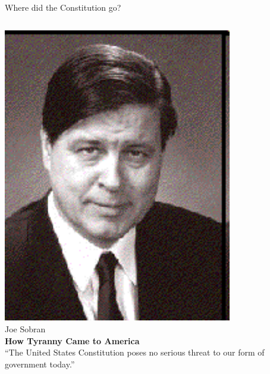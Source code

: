 \begin{frame}{Where did the Constitution go?}
    \begin{columns}[onlytextwidth]
            \centering
            \includegraphics[width=0.75\textwidth]{img/joe-sobran.png} \\
            Joe Sobran \\

            \textbf{How Tyranny Came to America} \\
            \vspace{20pt}
            {\large
                ``The United States Constitution poses no serious threat to our form of government today.''
            }

    \end{columns}
\end{frame}


